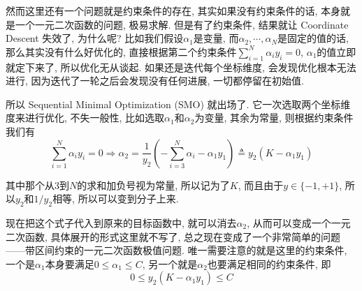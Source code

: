 \documentclass[a4paper,UTF8]{ctexart}
\theoremstyle{plain} \newtheorem{theorem}{定理}[section]
\theoremstyle{plain} \newtheorem{definition}{定义}[section]
\theoremstyle{plain} \newtheorem{lemma}{引理}[section]
\theoremstyle{plain} \newtheorem{proposition}{命题}[section]
\theoremstyle{plain} \newtheorem{example}{例}
\theoremstyle{plain} \newtheorem{remark}{注}
\theoremstyle{plain} \newtheorem{corollary}{推论}[section]
\begin{document}
然而这里还有一个问题就是约束条件的存在, 其实如果没有约束条件的话, 本身就是一个一元二次函数的问题, 极易求解. 但是有了约束条件, 结果就让 Coordinate Descent 失效了, 为什么呢? 比如我们假设$\alpha_1$是变量, 而$\alpha_2,\cdots,\alpha_N$是固定的值的话, 那么其实没有什么好优化的, 直接根据第二个约束条件$\sum\limits_{i=1}^{N} \alpha_{i} y_{i} = 0$, $\alpha_1$的值立即就定下来了, 所以优化无从谈起. 如果还是迭代每个坐标维度, 会发现优化根本无法进行, 因为迭代了一轮之后会发现没有任何进展, 一切都停留在初始值.

所以 Sequential Minimal Optimization (SMO) 就出场了. 它一次选取两个坐标维度来进行优化, 不失一般性, 比如选取$\alpha_1$和$\alpha_2$为变量, 其余为常量, 则根据约束条件我们有
\begin{equation*}
\sum_{i=1}^{N} \alpha_{i} y_{i} = 0 \Rightarrow \alpha_2 = \frac{1}{y_2} \left( - \sum_{i=3}^{N} \alpha_{i} - \alpha_1 y_1 \right) \triangleq y_2 (K - \alpha_1 y_1)
\end{equation*}

其中那个从$3$到$N$的求和加负号视为常量, 所以记为了$K$, 而且由于$y \in \{-1,+1\}$, 所以$y_2$和$1 / y_2$相等, 所以可以变到分子上来.

现在把这个式子代入到原来的目标函数中, 就可以消去$\alpha_2$, 从而可以变成一个一元二次函数, 具体展开的形式这里就不写了, 总之现在变成了一个非常简单的问题——带区间约束的一元二次函数极值问题. 唯一需要注意的就是这里的约束条件, 一个是$\alpha_{1}$本身要满足$0 \leqslant \alpha_{1} \leqslant C$, 另一个就是$\alpha_{2}$也要满足相同的约束条件, 即
\begin{equation*}
0 \leqslant y_2 (K - \alpha_1 y_1) \leqslant C
\end{equation*}
\end{document}
